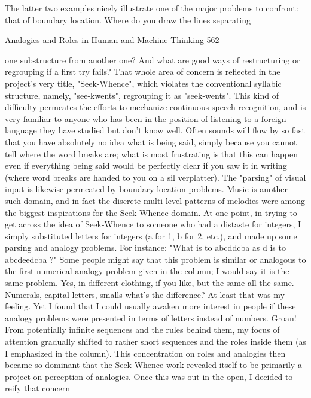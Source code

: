 The latter two examples nicely illustrate one of the major problems to confront: that
of boundary location. Where do you draw the lines separating




Analogies and Roles in Human and Machine Thinking                                     562

one substructure from another one? And what are good ways of restructuring or
regrouping if a first try fails? That whole area of concern is reflected in the project's
very title, "Seek-Whence", which violates the conventional syllabic structure, namely,
"see-kwents", regrouping it as "seek-wents". This kind of difficulty permeates the
efforts to mechanize continuous speech recognition, and is very familiar to anyone
who has been in the position of listening to a foreign language they have studied but
don't know well. Often sounds will flow by so fast that you have absolutely no idea
what is being said, simply because you cannot tell where the word breaks are; what is
most frustrating is that this can happen even if everything being said would be
perfectly clear if you saw it in writing (where word breaks are handed to you on a sil
verplatter). The "parsing" of visual input is likewise permeated by boundary-location
problems. Music is another such domain, and in fact the discrete multi-level patterns
of melodies were among the biggest inspirations for the Seek-Whence domain.
        At one point, in trying to get across the idea of Seek-Whence to someone who
had a distaste for integers, I simply substituted letters for integers (a for 1, b for 2,
etc.), and made up some parsing and analogy problems. For instance: "What is to
abcddcba as d is to abcdeedcba ?" Some people might say that this problem is similar
or analogous to the first numerical analogy problem given in the column; I would say
it is the same problem. Yes, in different clothing, if you like, but the same all the
same. Numerals, capital letters, smalls-what's the difference? At least that was my
feeling. Yet I found that I could usually awaken more interest in people if these
analogy problems were presented in terms of letters instead of numbers. Groan!
        From potentially infinite sequences and the rules behind them, my focus of
attention gradually shifted to rather short sequences and the roles inside them (as I
emphasized in the column). This concentration on roles and analogies then became so
dominant that the Seek-Whence work revealed itself to be primarily a project on
perception of analogies. Once this was out in the open, I decided to reify that concern
